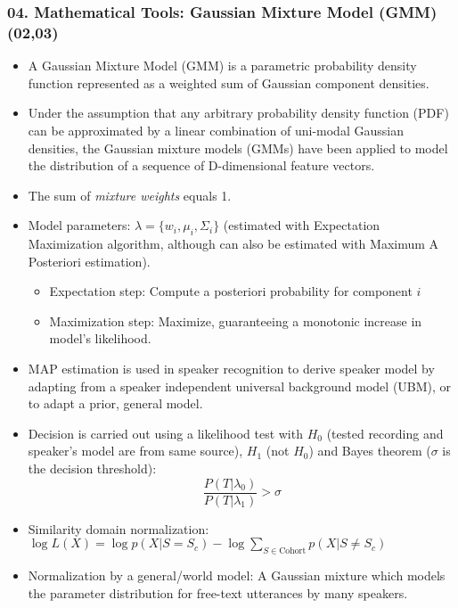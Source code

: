 \documentclass[a4paper]{article}
\begin{document}
    \subsubsection*{04. Mathematical Tools: Gaussian Mixture Model (GMM) (02,03)}
      \begin{itemize}
        \item A Gaussian Mixture Model (GMM) is a parametric probability density function represented as a weighted sum of Gaussian component densities.
        \item Under the assumption that any arbitrary probability density function (PDF) can be approximated by a linear combination of uni-modal Gaussian densities, the Gaussian mixture models (GMMs) have been applied to model the distribution of a sequence of D-dimensional feature vectors.
        \item The sum of \emph{mixture weights} equals 1.
        \item Model parameters: $\lambda = \{w_i, \mu_i,\Sigma_i\}$ (estimated with Expectation Maximization algorithm, although can also be estimated with Maximum A Posteriori estimation).
        \begin{itemize}
          \item Expectation step: Compute a posteriori probability for component $i$
          \item Maximization step: Maximize, guaranteeing a monotonic increase in model's likelihood.
        \end{itemize}
        \item MAP estimation is used in speaker recognition to derive speaker model by adapting from a speaker independent universal background model (UBM), or to adapt a prior, general model.
        \item Decision is carried out using a likelihood test with $H_0$ (tested recording and speaker's model are from same source), $H_1$ (not $H_0$) and Bayes theorem ($\sigma$ is the decision threshold): $$\frac{P(T|\lambda_0)}{P(T|\lambda_1)}>\sigma$$
        \item Similarity domain normalization: $\log{L(X)} = \log{p(X|S=S_c)} -
        \log{\sum_{S\in\text{Cohort}}{p(X|S \neq S_c)}}$
        \item Normalization by a general/world model: A Gaussian mixture which models the parameter distribution for free-text utterances by many speakers.
      \end{itemize}
\end{document}
